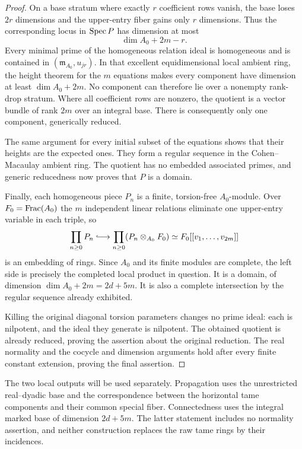 \begin{proof}
On a base stratum where exactly $r$ coefficient rows vanish, the
base loses $2r$ dimensions and the upper-entry fiber gains only
$r$ dimensions.  Thus the corresponding locus in $\operatorname{Spec} P$ has
dimension at most
\[
\dim A_0+2m-r.
\]
Every minimal prime of the homogeneous relation ideal is homogeneous
and is contained in $(\mathfrak m_{A_0},u_{jr})$.  In that excellent
equidimensional local ambient ring, the height theorem for the
$m$ equations makes every component have dimension at least
$\dim A_0+2m$.  No component can therefore lie over a nonempty
rank-drop stratum.  Where all coefficient rows are nonzero, the
quotient is a vector bundle of rank $2m$ over an integral base.
There is consequently only one component, generically reduced.

The same argument for every initial subset of the equations shows
that their heights are the expected ones.  They form a regular
sequence in the Cohen--Macaulay ambient ring.  The quotient has no
embedded associated primes, and generic reducedness now proves
that $P$ is a domain.

Finally, each homogeneous piece $P_n$ is a finite, torsion-free
$A_0$-module.  Over $F_0=\operatorname{Frac}(A_0)$ the $m$ independent linear
relations eliminate one upper-entry variable in each triple, so
\[
\prod_{n\ge0}P_n
 \lhook\joinrel\longrightarrow
\prod_{n\ge0}(P_n\otimes_{A_0}F_0)
 \simeq F_0[[v_1,\ldots,v_{2m}]]
\]
is an embedding of rings.  Since $A_0$ and its finite modules are
complete, the left side is precisely the completed local product
in question.  It is a domain, of dimension
$\dim A_0+2m=2d+5m$.  It is also a complete intersection by the
regular sequence already exhibited.

Killing the original diagonal torsion parameters changes no prime
ideal: each is nilpotent, and the ideal they generate is
nilpotent.  The obtained quotient is already reduced, proving the
assertion about the original reduction.  The real normality and
the cocycle and dimension arguments hold after every finite
constant extension, proving the final assertion.
\end{proof}

The two local outputs will be used separately. Propagation uses the
unrestricted real--dyadic base and the correspondence between the
horizontal tame components and their common special fiber.
Connectedness uses the integral marked base of dimension \(2d+5m\).
The latter statement includes no normality assertion, and neither
construction replaces the raw tame rings by their incidences.
